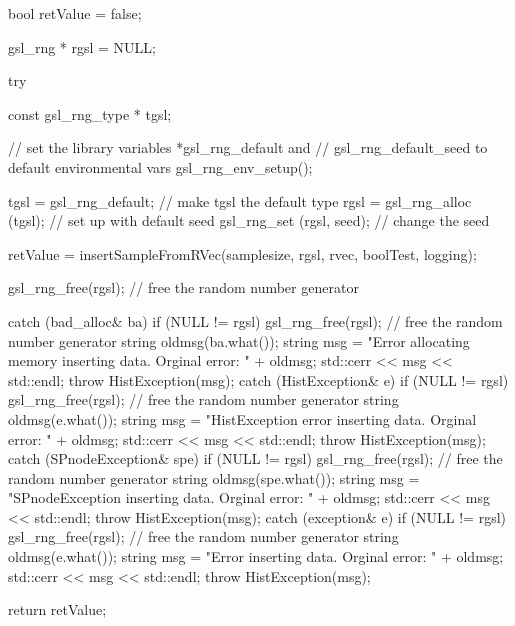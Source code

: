 \begin{DoxyCode}
{
    bool retValue = false;

    gsl_rng * rgsl = NULL;

    try {

        const gsl_rng_type * tgsl;

        // set the library variables *gsl_rng_default and
        // gsl_rng_default_seed to default environmental vars
        gsl_rng_env_setup();

        tgsl = gsl_rng_default; // make tgsl the default type
        rgsl = gsl_rng_alloc (tgsl); // set up with default seed
        gsl_rng_set (rgsl, seed); // change the seed

        retValue = insertSampleFromRVec(samplesize, rgsl, rvec, boolTest,
            logging);

        gsl_rng_free(rgsl); // free the random number generator

    }

    catch (bad_alloc& ba) {
        if (NULL != rgsl) gsl_rng_free(rgsl); // free the random number
       generator
        string oldmsg(ba.what());
        string msg = "Error allocating memory inserting data.  Orginal error: "
                                            + oldmsg;
        std::cerr << msg << std::endl;
        throw HistException(msg);
    }
    catch (HistException& e) {
        if (NULL != rgsl) gsl_rng_free(rgsl); // free the random number
       generator
        string oldmsg(e.what());
        string msg = "HistException error inserting data.  Orginal error: "
                                    + oldmsg;
        std::cerr << msg << std::endl;
        throw HistException(msg);
    }
    catch (SPnodeException& spe) {
        if (NULL != rgsl) gsl_rng_free(rgsl); // free the random number
       generator
        string oldmsg(spe.what());
        string msg = "SPnodeException inserting data.  Orginal error: " + 
      oldmsg;
        std::cerr << msg << std::endl;
        throw HistException(msg);
    }
    catch (exception& e) {
        if (NULL != rgsl) gsl_rng_free(rgsl); // free the random number
       generator
        string oldmsg(e.what());
        string msg = "Error inserting data.  Orginal error: " + oldmsg;
        std::cerr << msg << std::endl;
        throw HistException(msg);
    }


    return retValue;
}
\end{DoxyCode}

